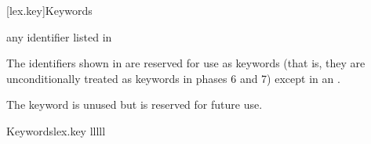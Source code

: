 [lex.key]{Keywords}

\begin{bnf}
\br
    \textnormal{any identifier listed in }\br
    \br
    \br
\end{bnf}

\pnum
{}%
The identifiers shown in  are reserved for use
as keywords (that is, they are unconditionally treated as keywords in
phases 6 and 7) except in an .
\begin{note}
The  keyword is unused but
is reserved for future use.
\end{note}

\begin{multicolfloattable}{Keywords}{lex.key}
{lllll}
 \\
 \\
 \\
 \\
 \\
 \\
 \\
 \\
 \\
 \\
 \\
 \\
 \\
 \\
 \\
 \\
 \\
\columnbreak
{} \\
 \\
 \\
 \\
 \\
 \\
 \\
 \\
 \\
 \\

\end{multicolfloattable}
